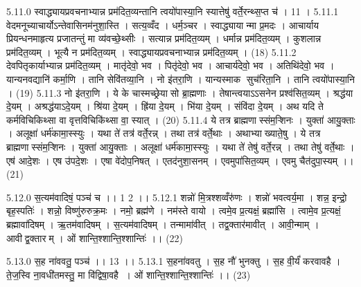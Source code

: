 5.11.0
स्वाद्ध्यायप्रवचनाभ्यान्न प्रम॑दित॒व्यन्तानि त्वयो॑पास्या॒नि स्यात्तेषु॑ वर्ते॒रन्थ्स॒प्त च॑ । 11 ।
5.11.1
वेदमनूच्याचार्योऽन्तेवासिनम॑नुशा॒स्ति । सत्य॒व्वँद । धर्म॒ञ्चर । स्वाद्ध्यायान्मा प्र॒मदः । आचार्याय प्रियन्धनमाहृत्य प्रजातन्तुं मा व्य॑वच्छे॒थ्सीः । सत्यान्न प्रम॑दित॒व्यम् । धर्मान्न प्रम॑दित॒व्यम् । कुशलान्न प्रम॑दित॒व्यम् । भूत्यै न प्रम॑दित॒व्यम् । स्वाद्ध्यायप्रवचनाभ्यान्न प्रम॑दित॒व्यम् । (18)
5.11.2
देवपितृकार्याभ्यान्न प्रम॑दित॒व्यम् । मातृ॑देवो॒ भव । पितृ॑देवो॒ भव । आचार्य॑देवो॒ भव । अतिथि॑देवो॒ भव । यान्यनवद्यानि॑ कर्मा॒णि । तानि सेवि॑तव्या॒नि । नो इ॑तरा॒णि । यान्यस्माक सुच॑रिता॒नि । तानि त्वयो॑पास्या॒नि । (19)
5.11.3
नो इ॑तरा॒णि । ये के चास्मच्छ्रेयासो ब्रा॒ह्मणाः । तेषान्त्वयाऽऽसनेन प्रश्व॑सित॒व्यम् । श्रद्ध॑या दे॒यम् । अश्रद्ध॑याऽदे॒यम् । श्रि॑या दे॒यम् । ह्रि॑या दे॒यम् । भि॑या दे॒यम् । संवि॑दा दे॒यम् । अथ यदि ते कर्मविचिकिथ्सा वा वृत्तविचिकि॑थ्सा वा॒ स्यात् । (20)
5.11.4
ये तत्र ब्राह्मणास्संम॒ऱ्शिनः । युक्ता॑ आयु॒क्ताः । अलूक्षा॑ धर्म॑कामा॒स्स्युः । यथा ते॑ तत्र॑ वर्ते॒रन्न् । तथा तत्र॑ वर्ते॒थाः । अथाभ्याख्याते॒षु । ये तत्र ब्राह्मणास्संम॒ऱ्शिनः । युक्ता॑ आयु॒क्ताः । अलूक्षा॑ धर्म॑कामा॒स्स्युः । यथा ते॑ तेषु॑ वर्ते॒रन्न् । तथा तेषु॑ वर्ते॒थाः । एष॑ आदे॒शः । एष उ॑पदे॒शः । एषा वे॑दोप॒निषत् । एतद॑नुशा॒सनम् । एवमुपा॑सित॒व्यम् । एवमु चैत॑दुपा॒स्यम् ।। (21)
\anuvakamend

5.12.0
स॒त्यम॑वादिषं॒ पञ्च॑ च ।। 1 2 ।।
5.12.1
शन्नो॑ मि॒त्रश्शव्वँरु॑णः । शन्नो॑ भवत्वर्य॒मा । शन्न॒ इन्द्रो॒ बृह॒स्पतिः॑ । शन्नो॒ विष्णु॑रुरुक्र॒मः । नमो॒ ब्रह्म॑णे । नम॑स्ते वायो । त्वमे॒व प्र॒त्यक्षं॒ ब्रह्मा॑सि । त्वामे॒व प्र॒त्यक्षं॒ ब्रह्मावा॑दिषम् । ऋ॒तम॑वादिषम् । स॒त्यम॑वादिषम् । तन्मामा॑वीत् । तद्व॒क्तार॑मावीत् । आवी॒न्माम् । आवीद्व॒क्तारम् । ओं शान्ति॒श्शान्ति॒श्शान्तिः॑ ।। (22)

\setcounter{anuvakam}{0}
5.13.0
स॒ह ना॑ववतु॒ पञ्च॑ ।। 13 ।।
5.13.1
स॒हना॑ववतु । स॒ह नौ॑ भुनक्तु । स॒ह वी॒र्यं॑ करवावहै । ते॒ज॒स्वि ना॒वधी॑तमस्तु॒ मा वि॑द्विषा॒वहै । ओं शान्ति॒श्शान्ति॒श्शान्तिः॑ ।। (23)
\anuvakamend

